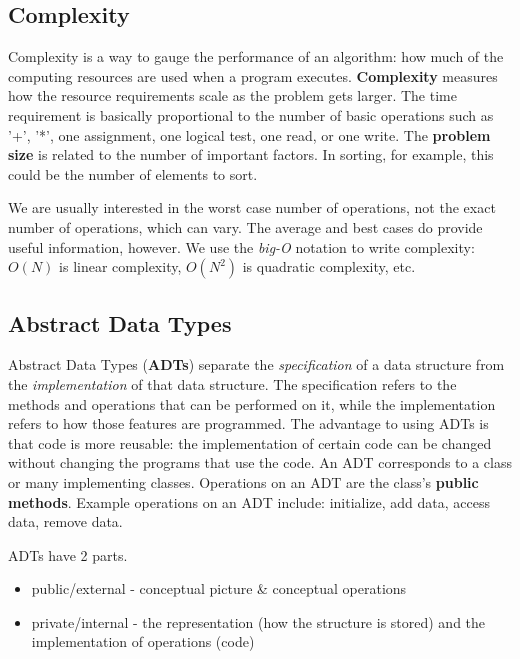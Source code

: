 \subsection{Complexity}

Complexity is a way to gauge the performance of an algorithm: how much of the computing resources are used when a program executes. \textbf{Complexity} measures how the resource requirements scale as the problem gets larger. The time requirement is basically proportional to the number of basic operations such as '+', '*', one assignment, one logical test, one read, or one write. The \textbf{problem size} is related to the number of important factors. In sorting, for example, this could be the number of elements to sort. 

We are usually interested in the worst case number of operations, not the exact number of operations, which can vary. The average and best cases do provide useful information, however. We use the \textit{big-O} notation to write complexity: $O(N)$ is linear complexity, $O(N^{2})$ is quadratic complexity, etc. 

\subsection{Abstract Data Types}

Abstract Data Types (\textbf{ADTs}) separate the \textit{specification} of a data structure from the \textit{implementation} of that data structure. The specification refers to the methods and operations that can be performed on it, while the implementation refers to how those features are programmed. The advantage to using ADTs is that code is more reusable: the implementation of certain code can be changed without changing the programs that use the code. An ADT corresponds to a class or many implementing classes. Operations on an ADT are the class's \textbf{public methods}. Example operations on an ADT include: initialize, add data, access data, remove data.

ADTs have 2 parts.
\begin{itemize}
	\item public/external - conceptual picture \& conceptual operations
	\item private/internal - the representation (how the structure is stored) and the implementation of operations (code)
\end{itemize}

